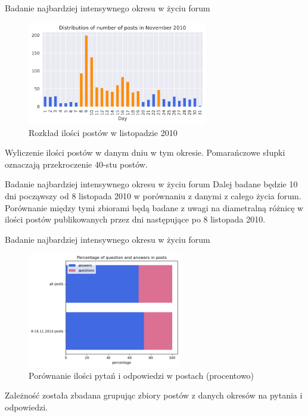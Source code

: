 \documentclass[./main.tex]{subfiles}
\begin{document}
\begin{frame}{Badanie najbardziej intensywnego okresu w życiu forum}
    \begin{figure}[t]
        \includegraphics[width=0.7\textwidth]{homebrewing/h4.png}
        \caption*{Rozkład ilości postów w listopadzie 2010}
    \end{figure}
    \small Wyliczenie ilości postów w danym dniu w tym okresie. Pomarańczowe słupki oznaczają przekroczenie 40-stu postów.
\end{frame}

\begin{frame}{Badanie najbardziej intensywnego okresu w życiu forum}
    Dalej badane będzie 10 dni począwszy od 8 listopada 2010 w porównaniu z danymi z całego życia forum. Porównanie między tymi zbiorami będą badane z uwagi na diametralną różnicę w ilości postów publikowanych przez dni następujące po 8 listopada 2010.
\end{frame}

\begin{frame}{Badanie najbardziej intensywnego okresu w życiu forum}
    \begin{figure}[t]
        \includegraphics[width=0.6\textwidth]{homebrewing/h5.png}
        \caption*{Porównanie ilości pytań i odpowiedzi w postach (procentowo)}
    \end{figure}
    \small Zależność została zbadana grupując zbiory postów z danych okresów na pytania i odpowiedzi.
\end{frame}
\end{document}
